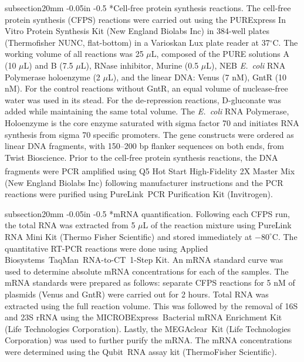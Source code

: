 \documentclass[12pt]{article}
\makeatletter
\renewcommand\subsection{\@startsection
	{subsection}{2}{0mm}
	{-0.05in}
	{-0.5\baselineskip}
	{\normalfont\normalsize\bfseries}}
\makeatother
\begin{document}
\subsection*{Cell-free protein synthesis reactions.}
The cell-free protein synthesis (CFPS) reactions were carried out using the PURExpress In Vitro Protein Synthesis Kit (New England Biolabs Inc) in 384-well plates (Thermofisher NUNC, flat-bottom) in a Varioskan Lux plate reader at 37$^{\circ}$C. The working volume of all reactions was 25 $\mu$L, composed of the PURE solutions A (10 $\mu$L) and B (7.5 $\mu$L), RNase inhibitor, Murine (0.5 $\mu$L), NEB \textit{E.~coli} RNA Polymerase holoenzyme (2 $\mu$L), and the linear DNA: Venus (7 nM), GntR (10 nM). For the control reactions without GntR, an equal volume of nuclease-free water was used in its stead. For the de-repression reactions, D-gluconate was added while maintaining the same total volume. The \textit{E.~coli} RNA Polymerase, Holoenzyme is the core enzyme saturated with sigma factor 70 and initiates RNA synthesis from sigma 70 specific promoters. The gene constructs were ordered as linear DNA fragments, with 150--200 bp flanker sequences on both ends, from Twist Bioscience. Prior to the cell-free protein synthesis reactions, the DNA fragments were PCR amplified using Q5\textsuperscript{\textregistered} Hot Start High-Fidelity 2X Master Mix (New England Biolabs Inc) following manufacturer instructions and the PCR reactions were purified using PureLink\texttrademark~PCR Purification Kit (Invitrogen).

\subsection*{mRNA quantification.}
Following each CFPS run, the total RNA was extracted from 5 $\mu$L of the reaction mixture using PureLink RNA Mini Kit (Thermo Fisher Scientific) and stored immediately at $-80^{\circ}$C. The quantitative RT-PCR reactions were done using Applied Biosystems\texttrademark~TaqMan\texttrademark~RNA-to-CT\texttrademark~1-Step Kit. An mRNA standard curve was used to determine absolute mRNA concentrations for each of the samples. The mRNA standards were prepared as follows: separate CFPS reactions for 5 nM of plasmids (Venus and GntR) were carried out for 2 hours. Total RNA was extracted using the full reaction volume. This was followed by the removal of 16S and 23S rRNA using the MICROBExpress\texttrademark~Bacterial mRNA Enrichment Kit (Life Technologies Corporation). Lastly, the MEGAclear\texttrademark~Kit (Life Technologies Corporation) was used to further purify the mRNA. The mRNA concentrations were determined using the Qubit\texttrademark~RNA assay kit (ThermoFisher Scientific).
\end{document}
